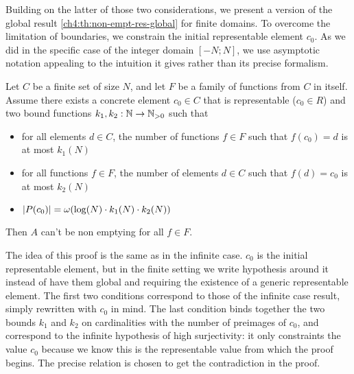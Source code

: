 Building on the latter of those two considerations, we present a version of the global result \ref{ch4:th:non-empt-res-global} for finite domains. To overcome the limitation of boundaries, we constrain the initial representable element $c_0$. As we did in the specific case of the integer domain $[-N; N]$, we use asymptotic notation appealing to the intuition it gives rather than its precise formalism.
\begin{theorem}\label{ch4:th:non-empt-res-finite-global}
	Let $C$ be a finite set of size $N$, and let $F$ be a family of functions from $C$ in itself. Assume there exists a concrete element $c_0 \in C$ that is representable ($c_0 \in R$) and two bound functions $k_1, k_2 : \mathbb{N} \rightarrow \mathbb{N}_{>0}$ such that
	\begin{itemize}
		\item for all elements $d \in C$, the number of functions $f \in F$ such that $f(c_0) = d$ is at most $k_1(N)$
		\item for all functions $f \in F$, the number of elements $d \in C$ such that $f(d) = c_0$ is at most $k_2(N)$
		\item $\lvert P(c_0)\rvert = \omega(\log(N) \cdot k_1(N) \cdot k_2(N))$
	\end{itemize}
	Then $A$ can't be non emptying for all $f \in F$.
\end{theorem}
The idea of this proof is the same as in the infinite case. $c_0$ is the initial representable element, but in the finite setting we write hypothesis around it instead of have them global and requiring the existence of a generic representable element. The first two conditions correspond to those of the infinite case result, simply rewritten with $c_0$ in mind. The last condition binds together the two bounds $k_1$ and $k_2$ on cardinalities with the number of preimages of $c_0$, and correspond to the infinite hypothesis of high surjectivity: it only constraints the value $c_0$ because we know this is the representable value from which the proof begins. The precise relation is chosen to get the contradiction in the proof.
